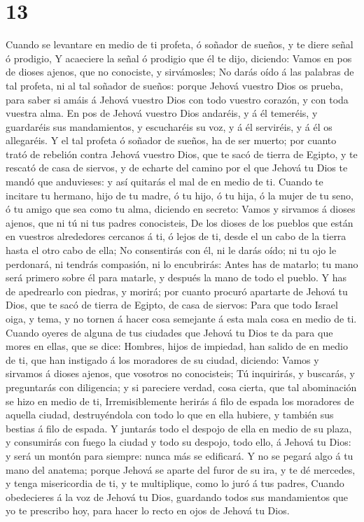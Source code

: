 \hypertarget{section-12}{%
\section{13}\label{section-12}}

 Cuando se levantare en medio de ti profeta, ó soñador de
sueños, y te diere señal ó prodigio,  Y acaeciere la señal ó
prodigio que él te dijo, diciendo: Vamos en pos de dioses ajenos, que no
conociste, y sirvámosles;  No darás oído á las palabras de
tal profeta, ni al tal soñador de sueños: porque Jehová vuestro Dios os
prueba, para saber si amáis á Jehová vuestro Dios con todo vuestro
corazón, y con toda vuestra alma.  En pos de Jehová vuestro
Dios andaréis, y á él temeréis, y guardaréis sus mandamientos, y
escucharéis su voz, y á él serviréis, y á él os allegaréis. 
Y el tal profeta ó soñador de sueños, ha de ser muerto; por cuanto trató
de rebelión contra Jehová vuestro Dios, que te sacó de tierra de Egipto,
y te rescató de casa de siervos, y de echarte del camino por el que
Jehová tu Dios te mandó que anduvieses: y así quitarás el mal de en
medio de ti.  Cuando te incitare tu hermano, hijo de tu
madre, ó tu hijo, ó tu hija, ó la mujer de tu seno, ó tu amigo que sea
como tu alma, diciendo en secreto: Vamos y sirvamos á dioses ajenos, que
ni tú ni tus padres conocisteis,  De los dioses de los
pueblos que están en vuestros alrededores cercanos á ti, ó lejos de ti,
desde el un cabo de la tierra hasta el otro cabo de ella; 
No consentirás con él, ni le darás oído; ni tu ojo le perdonará, ni
tendrás compasión, ni lo encubrirás:  Antes has de matarlo;
tu mano será primero sobre él para matarle, y después la mano de todo el
pueblo.  Y has de apedrearlo con piedras, y morirá; por
cuanto procuró apartarte de Jehová tu Dios, que te sacó de tierra de
Egipto, de casa de siervos:  Para que todo Israel oiga, y
tema, y no tornen á hacer cosa semejante á esta mala cosa en medio de
ti.  Cuando oyeres de alguna de tus ciudades que Jehová tu
Dios te da para que mores en ellas, que se dice:  Hombres,
hijos de impiedad, han salido de en medio de ti, que han instigado á los
moradores de su ciudad, diciendo: Vamos y sirvamos á dioses ajenos, que
vosotros no conocisteis;  Tú inquirirás, y buscarás, y
preguntarás con diligencia; y si pareciere verdad, cosa cierta, que tal
abominación se hizo en medio de ti,  Irremisiblemente
herirás á filo de espada los moradores de aquella ciudad, destruyéndola
con todo lo que en ella hubiere, y también sus bestias á filo de espada.
 Y juntarás todo el despojo de ella en medio de su plaza, y
consumirás con fuego la ciudad y todo su despojo, todo ello, á Jehová tu
Dios: y será un montón para siempre: nunca más se edificará.
 Y no se pegará algo á tu mano del anatema; porque Jehová
se aparte del furor de su ira, y te dé mercedes, y tenga misericordia de
ti, y te multiplique, como lo juró á tus padres,  Cuando
obedecieres á la voz de Jehová tu Dios, guardando todos sus mandamientos
que yo te prescribo hoy, para hacer lo recto en ojos de Jehová tu Dios.

